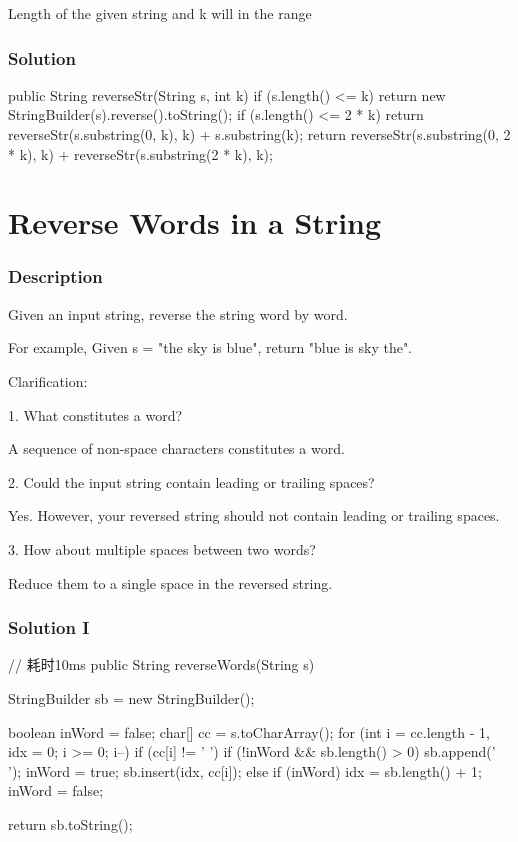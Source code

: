 Length of the given string and k will in the range \code{[1, 10000]}

\subsubsection{Solution}

\begin{Code}
public String reverseStr(String s, int k) {
    if (s.length() <= k) {
        return new StringBuilder(s).reverse().toString();
    }
    if (s.length() <= 2 * k) {
        return reverseStr(s.substring(0, k), k) + s.substring(k);
    }
    return reverseStr(s.substring(0, 2 * k), k) + reverseStr(s.substring(2 * k), k);
}
\end{Code}

\newpage

\section{Reverse Words in a String} %

\subsubsection{Description}
Given an input string, reverse the string word by word.

For example,
Given s = "the sky is blue",
return "blue is sky the".

Clarification:

1. What constitutes a word?

A sequence of non-space characters constitutes a word.

2. Could the input string contain leading or trailing spaces?

Yes. However, your reversed string should not contain leading or trailing spaces.

3. How about multiple spaces between two words?

Reduce them to a single space in the reversed string.
\subsubsection{Solution I}

\begin{Code}
// 耗时10ms
public String reverseWords(String s) {
    StringBuilder sb = new StringBuilder();

    boolean inWord = false;
    char[] cc = s.toCharArray();
    for (int i = cc.length - 1, idx = 0; i >= 0; i--) {
        if (cc[i] != ' ') {
            if (!inWord && sb.length() > 0) {
                sb.append(' ');
            }
            inWord = true;
            sb.insert(idx, cc[i]);
        } else if (inWord) {
            idx = sb.length() + 1;
            inWord = false;
        }
    }

    return sb.toString();
}
\end{Code}

